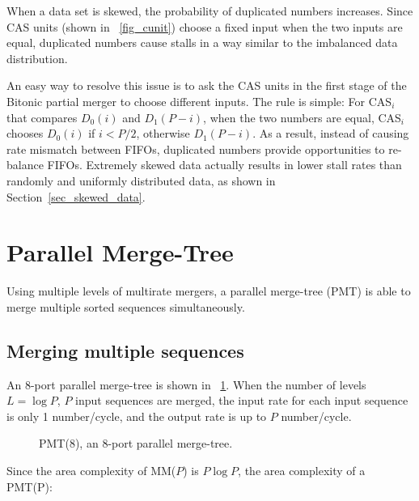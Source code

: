 \documentclass[10pt, conference]{IEEEtran}
\begin{document}
When a data set is skewed, the probability of duplicated numbers increases.
Since CAS units (shown in \figurename~\ref{fig_cunit}) choose a fixed input when the two inputs are equal,
duplicated numbers cause stalls in a way similar to the imbalanced data distribution.

An easy way to resolve this issue is to ask the CAS units in the first stage of the Bitonic partial merger to choose different inputs.
The rule is simple: For CAS$_i$ that compares $D_0(i)$ and $D_1(P-i)$,
when the two numbers are equal, CAS$_i$ chooses $D_0(i)$ if $i < P/2$, otherwise $D_1(P-i)$.
As a result, instead of causing rate mismatch between FIFOs, duplicated numbers provide opportunities to re-balance FIFOs.
Extremely skewed data actually results in lower stall rates than randomly and uniformly distributed data, as shown in Section~\ref{sec_skewed_data}.

\section{Parallel Merge-Tree}

Using multiple levels of multirate mergers, a parallel merge-tree (PMT) is able to merge multiple sorted sequences simultaneously.

\subsection{Merging multiple sequences}

An 8-port parallel merge-tree is shown in \figurename~\ref{fig_pmtree}.
When the number of levels $L = \log P$, $P$ input sequences are merged,
the input rate for each input sequence is only 1 number/cycle,
and the output rate is up to $P$ number/cycle.

\begin{figure}[bt]
\caption{PMT(8), an $8$-port parallel merge-tree.}\label{fig_pmtree}
\end{figure}

Since the area complexity of MM($P$) is $P \log P$,  the area complexity of a PMT(P):
\end{document}
